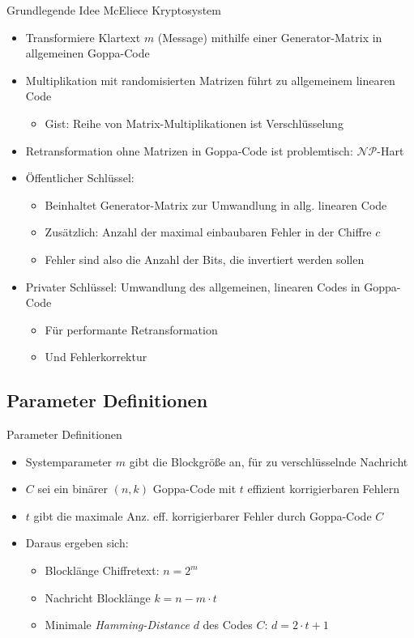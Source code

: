 \documentclass[11pt%
,aspectratio=169%
]{beamer}
\begin{document}
\begin{frame}{Grundlegende Idee McEliece Kryptosystem}
	\begin{itemize}
		\item Transformiere Klartext $m$ (Message) mithilfe einer Generator-Matrix in allgemeinen Goppa-Code
		\item Multiplikation mit randomisierten Matrizen führt zu allgemeinem linearen Code
		\begin{itemize}
		    \item Gist: Reihe von Matrix-Multiplikationen ist Verschlüsselung
		\end{itemize}
		\item Retransformation ohne Matrizen in Goppa-Code ist problemtisch: $\mathcal{NP}$-Hart \cite{Stinson2018Cryptography}
        \item Öffentlicher Schlüssel:
        \begin{itemize}
            \item Beinhaltet Generator-Matrix zur Umwandlung in allg. linearen Code
            \item Zusätzlich: Anzahl der maximal einbaubaren Fehler in der Chiffre $c$
            \item Fehler sind also die Anzahl der Bits, die invertiert werden sollen
        \end{itemize}
	    \item Privater Schlüssel: Umwandlung des allgemeinen, linearen Codes in Goppa-Code
	    \begin{itemize}
	        \item Für performante Retransformation
	        \item Und Fehlerkorrektur
	    \end{itemize}
	\end{itemize}
\end{frame}
 

\subsection{Parameter Definitionen}
\begin{frame}{Parameter Definitionen}
    \begin{itemize}
        \item Systemparameter $m$ gibt die Blockgröße an, für zu verschlüsselnde Nachricht
        \item $C$ sei ein binärer $(n,k)$ Goppa-Code mit $t$ effizient korrigierbaren Fehlern
        \item $t$ gibt die maximale Anz. eff. korrigierbarer Fehler durch Goppa-Code $C$
        \item Daraus ergeben sich:
        \begin{itemize}
            \item Blocklänge Chiffretext: $n = 2^m$
            \item Nachricht Blocklänge $k = n - m \cdot t$
            \item Minimale \emph{Hamming-Distance} $d$ des Codes $C$: $d = 2 \cdot t + 1$
        \end{itemize}
    \end{itemize}   
\end{frame}
\end{document}
